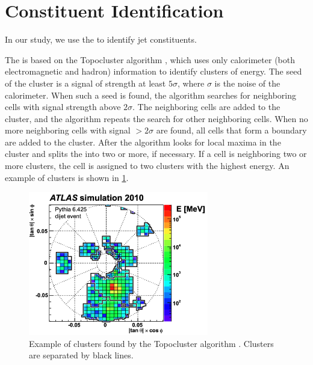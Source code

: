 
\section{Constituent Identification}
\label{sec:pfo}
In our study, we use the \PFa \cite{PFO} to identify jet constituents.

The \PFa is based on the Topocluster algorithm \cite{topocluster}, which uses only calorimeter (both electromagnetic and hadron) information to identify clusters of energy.
The seed of the cluster is a signal of strength at least $5\sigma$, where $\sigma$ is the noise of the calorimeter.
When such a seed is found, the algorithm searches for neighboring cells with signal strength above $2\sigma$.
The neighboring cells are added to the cluster, and the algorithm repeats the search for other neighboring cells.
When no more neighboring cells with signal $>2\sigma$ are found, all cells that form a boundary are added to the cluster.
After the algorithm looks for local maxima in the cluster and splits the into two or more, if necessary.
If a cell is neighboring two or more clusters, the cell is assigned to two clusters with the highest energy.
An example of clusters is shown in \cref{fig:topocluster}. 
\begin{figure}[ht]
    \centering
    \includegraphics[width=0.7\textwidth]{src/img/topocluster.png}
    \caption{Example of clusters found by the Topocluster algorithm \cite{topocluster}. Clusters are separated by black lines.}
    \label{fig:topocluster}
\end{figure}

